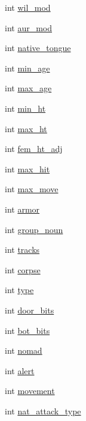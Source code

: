 \begin{DoxyCompactItemize}
\item 
int \hyperlink{structrace__data_a56763a2631d10d3eb1e12aced61e43ec}{wil\-\_\-mod}
\item 
int \hyperlink{structrace__data_a1fd816c3fb08aaa56c7715591dd4e7fd}{aur\-\_\-mod}
\item 
int \hyperlink{structrace__data_a5618a80ce95fe579eda518ffab2fb0c0}{native\-\_\-tongue}
\item 
int \hyperlink{structrace__data_aa44e2496fc5d2b0d883c780d6393668b}{min\-\_\-age}
\item 
int \hyperlink{structrace__data_aaa962a76375fbb05ffac983cd7d778da}{max\-\_\-age}
\item 
int \hyperlink{structrace__data_aa000de1345cea8266953c4af804b139d}{min\-\_\-ht}
\item 
int \hyperlink{structrace__data_a6b230534f546dabdcb1b3ecce37ccfd7}{max\-\_\-ht}
\item 
int \hyperlink{structrace__data_a5accb796e12200b53618276cc31222fe}{fem\-\_\-ht\-\_\-adj}
\item 
int \hyperlink{structrace__data_aaecfeaf5bce9f3ce0918c2c960f7fbb9}{max\-\_\-hit}
\item 
int \hyperlink{structrace__data_ad5506364d3b635afd9bef02afa1d4ba6}{max\-\_\-move}
\item 
int \hyperlink{structrace__data_ab8154a5bdf47b222816d3ed3f2282762}{armor}
\item 
int \hyperlink{structrace__data_a693991af1e7db0c461ef9a1118e5b6f1}{group\-\_\-noun}
\item 
int \hyperlink{structrace__data_a382710ad25338369b82bfc462645dadc}{tracks}
\item 
int \hyperlink{structrace__data_aa97dc05b42c840bb73ee02d6d21604f4}{corpse}
\item 
int \hyperlink{structrace__data_a379b96a5156ce510e1f4e293714e6841}{type}
\item 
int \hyperlink{structrace__data_a0314adfa651eb3851b2b52e263c5c23a}{door\-\_\-bits}
\item 
int \hyperlink{structrace__data_a647bbc5bd551b8fcec36a20586e8b6c3}{bot\-\_\-bits}
\item 
int \hyperlink{structrace__data_aa3c05eb94e021134e9ec58302fd853c8}{nomad}
\item 
int \hyperlink{structrace__data_a621752ac0b5eb4383c78d9f53ec9ae30}{alert}
\item 
int \hyperlink{structrace__data_a41265bdb5463b70c40ed6e0b2c80e524}{movement}
\item 
int \hyperlink{structrace__data_a4b76257366e2806f00a6af2053f72d7b}{nat\-\_\-attack\-\_\-type}

\end{DoxyCompactItemize}
